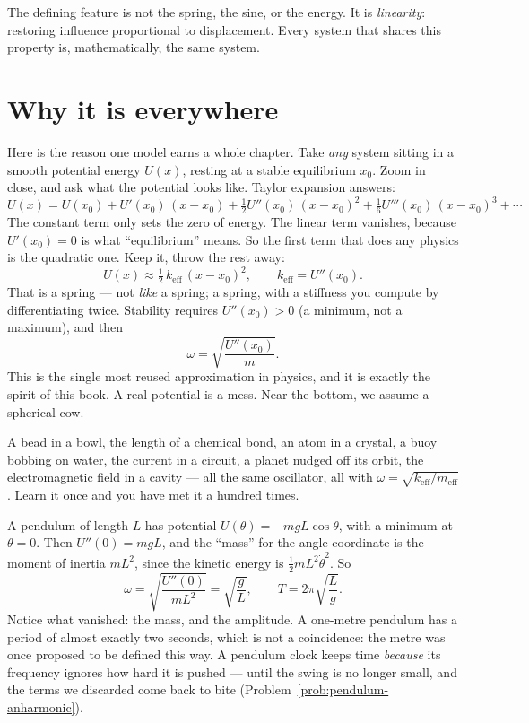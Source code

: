 \begin{keyidea}
The defining feature is not the spring, the sine, or the energy. It is \emph{linearity}: restoring influence proportional to displacement. Every system that shares this property is, mathematically, the same system.
\end{keyidea}

\section{Why it is everywhere}

Here is the reason one model earns a whole chapter. Take \emph{any} system sitting in a smooth potential energy $U(x)$, resting at a stable equilibrium $x_{0}$. Zoom in close, and ask what the potential looks like. Taylor expansion answers:
\[
  U(x)=U(x_{0})+U'(x_{0})\,(x-x_{0})+\tfrac12 U''(x_{0})\,(x-x_{0})^{2}+\tfrac16 U'''(x_0)\,(x-x_0)^3+\cdots
\]
The constant term only sets the zero of energy. The linear term vanishes, because $U'(x_{0})=0$ is what ``equilibrium'' means. So the first term that does any physics is the quadratic one. Keep it, throw the rest away:
\[
  U(x)\approx \tfrac12\,k_{\mathrm{eff}}\,(x-x_{0})^{2},\qquad k_{\mathrm{eff}}=U''(x_{0}).
\]
That is a spring --- not \emph{like} a spring; a spring, with a stiffness you compute by differentiating twice. Stability requires $U''(x_0) > 0$ (a minimum, not a maximum), and then
\[
  \omega = \sqrt{\frac{U''(x_0)}{m}}.
\]
This is the single most reused approximation in physics, and it is exactly the spirit of this book. A real potential is a mess. Near the bottom, we assume a spherical cow.

\begin{prototype}
A bead in a bowl, the length of a chemical bond, an atom in a crystal, a buoy bobbing on water, the current in a circuit, a planet nudged off its orbit, the electromagnetic field in a cavity --- all the same oscillator, all with $\omega=\sqrt{k_{\mathrm{eff}}/m_{\mathrm{eff}}}$. Learn it once and you have met it a hundred times.
\end{prototype}

\begin{example}
A pendulum of length $L$ has potential $U(\theta)=-mgL\cos\theta$, with a minimum at $\theta=0$. Then $U''(0)=mgL$, and the ``mass'' for the angle coordinate is the moment of inertia $mL^{2}$, since the kinetic energy is $\tfrac12 mL^2\dot\theta^2$. So
\[
  \omega=\sqrt{\frac{U''(0)}{mL^{2}}}=\sqrt{\frac{g}{L}}, \qquad T = 2\pi\sqrt{\frac{L}{g}}.
\]
Notice what vanished: the mass, and the amplitude. A one-metre pendulum has a period of almost exactly two seconds, which is not a coincidence: the metre was once proposed to be defined this way. A pendulum clock keeps time \emph{because} its frequency ignores how hard it is pushed --- until the swing is no longer small, and the terms we discarded come back to bite (Problem~\ref{prob:pendulum-anharmonic}).
\end{example}

